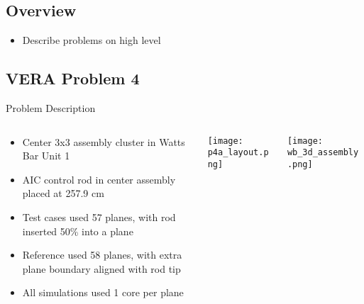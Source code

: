 \subsection{Overview}
\begin{frame}
    
    \begin{itemize}
        \item Describe problems on high level
    \end{itemize}

\end{frame}


\subsection{VERA Problem 4}
\begin{frame}[t]{Problem Description}
    
\begin{columns}
    \begin{column}{0.5\textwidth}
        \begin{itemize}
            \item Center 3x3 assembly cluster in Watts Bar Unit 1
            \item AIC control rod in center assembly placed at 257.9 cm
            \item Test cases used 57 planes, with rod inserted 50\% into a plane
            \item Reference used 58 planes, with extra plane boundary aligned 
            with rod tip
            \item All simulations used 1 core per plane
        \end{itemize}
    \end{column}
    \begin{column}{0.28\textwidth}
        \texttt{[image: p4a\_layout.png]}
    \end{column}
    \begin{column}{0.22\textwidth}
        \texttt{[image: wb\_3d\_assembly.png]}
\end{column}
\end{columns}
    
\end{frame}



